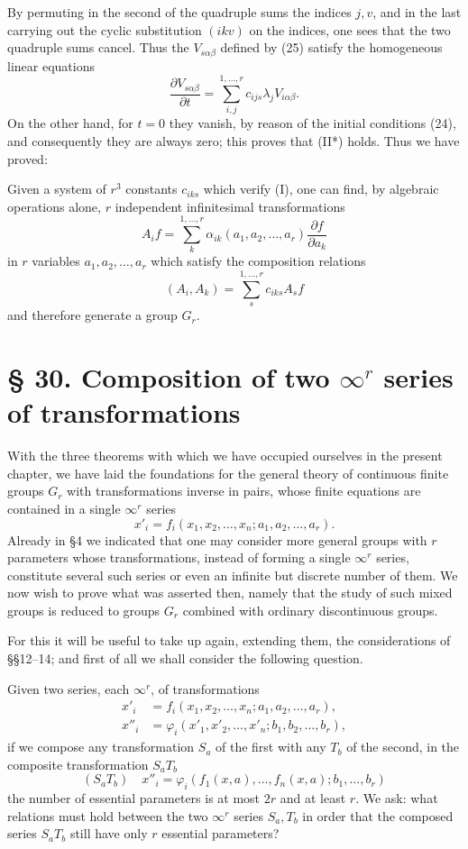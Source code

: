 \documentclass[11pt]{book}
\begin{document}
By permuting in the second of the quadruple sums the indices $j,v$, and in the last carrying out the cyclic substitution $(ikv)$ on the indices, one sees that the two quadruple sums cancel. Thus the $V_{s\alpha\beta}$ defined by (25) satisfy the homogeneous linear equations
\[
 \frac{\partial V_{s\alpha\beta}}{\partial t}
 =\sum\limits_{i,j}^{1,\ldots,r}c_{ijs}\lambda_jV_{i\alpha\beta}.
\]
On the other hand, for $t=0$ they vanish, by reason of the initial conditions (24), and consequently they are always zero; this proves that (II*) holds. Thus we have proved:

Given a system of $r^3$ constants $c_{iks}$ which verify (I), one can find, by algebraic operations alone, $r$ independent infinitesimal transformations
\[
 A_i f=\sum\limits_k^{1,\ldots,r}\alpha_{ik}(a_1,a_2,\ldots,a_r)\frac{\partial f}{\partial a_k}
\]
in $r$ variables $a_1,a_2,\ldots,a_r$ which satisfy the composition relations
\[
 (A_i,A_k)=\sum\limits_s^{1,\ldots,r} c_{iks}A_s f
\]
and therefore generate a group $G_r$.

\section*{\S{} 30. Composition of two $\infty^r$ series of transformations}

With the three theorems with which we have occupied ourselves in the present chapter, we have laid the foundations for the general theory of continuous finite groups $G_r$ with transformations inverse in pairs, whose finite equations are contained in a single $\infty^r$ series
\[
 x'_i=f_i(x_1,x_2,\ldots,x_n;a_1,a_2,\ldots,a_r).
\]
Already in \S{}4 we indicated that one may consider more general groups with $r$ parameters whose transformations, instead of forming a single $\infty^r$ series, constitute several such series or even an infinite but discrete number of them. We now wish to prove what was asserted then, namely that the study of such mixed groups is reduced to groups $G_r$ combined with ordinary discontinuous groups.

For this it will be useful to take up again, extending them, the considerations of \S\S{}12--14; and first of all we shall consider the following question.

Given two series, each $\infty^r$, of transformations
\begin{align*}
 x'_i&=f_i(x_1,x_2,\ldots,x_n;a_1,a_2,\ldots,a_r), \tag{26}\\
 x''_i&=\varphi_i(x'_1,x'_2,\ldots,x'_n;b_1,b_2,\ldots,b_r), \tag{27}
\end{align*}
if we compose any transformation $S_a$ of the first with any $T_b$ of the second, in the composite transformation $S_aT_b$
\[
 (S_aT_b)\quad
 x''_i=\varphi_i(f_1(x,a),\ldots,f_n(x,a);b_1,\ldots,b_r)
\]
the number of essential parameters is at most $2r$ and at least $r$\begingroup\renewcommand\thefootnote{(*)}\footnotemark\endgroup.\begingroup\renewcommand\thefootnote{(*)}\endgroup{} We ask: what relations must hold between the two $\infty^r$ series $S_a,T_b$ in order that the composed series $S_aT_b$ still have only $r$ essential parameters?
\end{document}
